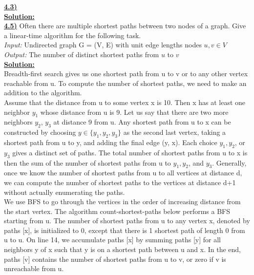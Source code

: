 \documentclass{article}
\begin{document}
\vspace{.2in}
\noindent \textbf{\underline{4.3)}} \\

\noindent \textbf{\underline{Solution:}}  \\



\vspace{2in}
\noindent \textbf{\underline{4.5)}} Often there are multiple shortest paths between two nodes of a graph. Give a linear-time algorithm for the following task. \\

\indent \textit{Input:} Undirected graph G = (V, E) with unit edge lengths nodes $u, v \in V$ \\
\indent \textit{Output:} The number of distinct shortest paths from $u$ to $v$ \\

\noindent \textbf{\underline{Solution:}}  \\
\indent Breadth-first search gives us one shortest path from u to v or to any other vertex reachable from u. To compute the number of shortest paths, we need to make an addition to the algorithm. \\
Assume that the distance from u to some vertex x is 10.  Then x has at least one neighbor $y_1$ whose distance from u is 9.  Let us say that there are two more neighbors $y_2$, $y_3$ at distance 9 from u. Any shortest path from u to x can be constructed by choosing $y \in \{y_1, y_2, y_3\}$ as the second last vertex, taking a shortest path from u to y, and adding the final edge (y, x). Each choice $y_1, y_2$, or $y_3$ gives a distinct set of paths. The total number of shortest paths from u to x is then the sum of the number of shortest paths from u to $y_1, y_2$, and $y_3$. Generally, once we know the number of shortest paths from u to all vertices at distance d, we can compute the number of shortest paths to the vertices at distance d+1 without actually enumerating the paths. \\

We use BFS to go through the vertices in the order of increasing distance from the start vertex. The algorithm  count-shortest-paths below performs a BFS starting from u. The number of shortest paths from u to any vertex x, denoted by paths [x], is initialized to 0, except that there is 1 shortest path of length 0 from u to u. On line 14, we accumulate paths [x] by summing paths [y] for all neighbors y of x such that y is on a shortest path between u and x. In the end, paths [v] contains the number of shortest paths from u to v, or zero if v is unreachable from u. \\
\end{document}
